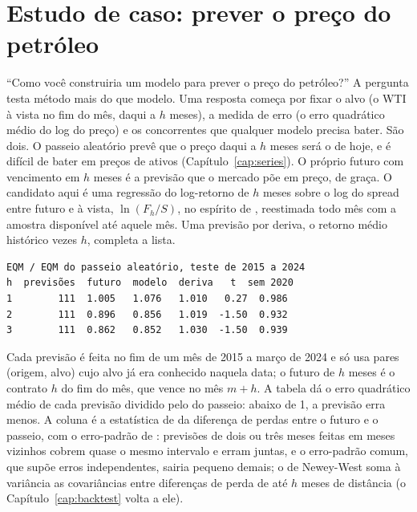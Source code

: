 \section{Estudo de caso: prever o preço do petróleo}
\label{sec:c09-previsao}

``Como você construiria um modelo para prever o preço do petróleo?'' A pergunta testa método mais do que modelo. Uma resposta começa por fixar o alvo (o WTI à vista no fim do mês, daqui a $h$ meses), a medida de erro (o erro quadrático médio do log do preço) e os concorrentes que qualquer modelo precisa bater. São dois. O passeio aleatório prevê que o preço daqui a $h$ meses será o de hoje, e é difícil de bater em preços de ativos (Capítulo~\ref{cap:series}). O próprio futuro com vencimento em $h$ meses é a previsão que o mercado põe em preço, de graça. O candidato aqui é uma regressão do log-retorno de $h$ meses sobre o log do spread entre futuro e à vista, $\ln(F_h/S)$, no espírito de \citet{fama1987}, reestimada todo mês com a amostra disponível até aquele mês. Uma previsão por deriva, o retorno médio histórico vezes $h$, completa a lista.



\begin{lstlisting}[style=saida]
EQM / EQM do passeio aleatório, teste de 2015 a 2024
h  previsões  futuro  modelo  deriva   t  sem 2020
1        111  1.005   1.076   1.010   0.27  0.986
2        111  0.896   0.856   1.019  -1.50  0.932
3        111  0.862   0.852   1.030  -1.50  0.939
\end{lstlisting}

Cada previsão é feita no fim de um mês de 2015 a março de 2024 e só usa pares (origem, alvo) cujo alvo já era conhecido naquela data; o futuro de $h$ meses é o contrato $h$ do fim do mês, que vence no mês $m + h$. A tabela dá o erro quadrático médio de cada previsão dividido pelo do passeio: abaixo de 1, a previsão erra menos. A coluna  é a estatística de \citet{diebold1995} da diferença de perdas entre o futuro e o passeio, com o erro-padrão de \citet{newey1987}: previsões de dois ou três meses feitas em meses vizinhos cobrem quase o mesmo intervalo e erram juntas, e o erro-padrão comum, que supõe erros independentes, sairia pequeno demais; o de Newey-West soma à variância as covariâncias entre diferenças de perda de até $h$ meses de distância (o Capítulo~\ref{cap:backtest} volta a ele).

